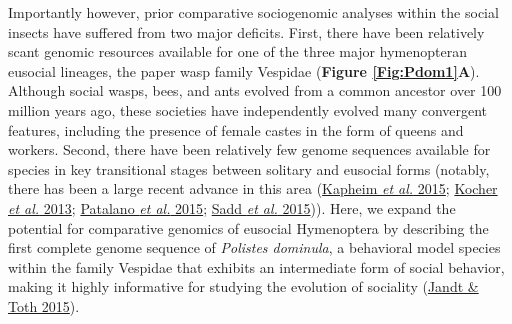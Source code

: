 Importantly however, prior comparative sociogenomic analyses within the
social insects have suffered from two major deficits. First, there have
been relatively scant genomic resources available for one of the three
major hymenopteran eusocial lineages, the paper wasp family Vespidae
(\textbf{Figure \ref{Fig:Pdom1}A}). Although social wasps, bees, and ants evolved from
a common ancestor over 100 million years ago, these societies have
independently evolved many convergent features, including the presence
of female castes in the form of queens and workers. Second, there have
been relatively few genome sequences available for species in key
transitional stages between solitary and eusocial forms (notably, there
has been a large recent advance in this area
(\protect\hyperlink{ux5fENREFux5f24}{Kapheim \textit{et al.} 2015};
\protect\hyperlink{ux5fENREFux5f25}{Kocher \textit{et al.} 2013};
\protect\hyperlink{ux5fENREFux5f43}{Patalano \textit{et al.} 2015};
\protect\hyperlink{ux5fENREFux5f51}{Sadd \textit{et al.} 2015})). Here, we
expand the potential for comparative genomics of eusocial Hymenoptera by
describing the first complete genome sequence of \textit{Polistes
dominula}, a behavioral model species within the family Vespidae that
exhibits an intermediate form of social behavior, making it highly
informative for studying the evolution of sociality
(\protect\hyperlink{ux5fENREFux5f21}{Jandt \& Toth 2015}).

